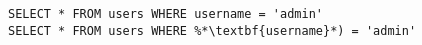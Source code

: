 \documentclass[border={5pt, 15pt}]{standalone}
\begin{document}
\begin{lstlisting}
SELECT * FROM users WHERE username = 'admin'
SELECT * FROM users WHERE %*\textbf{username}*) = 'admin'
\end{lstlisting}
\end{document}
